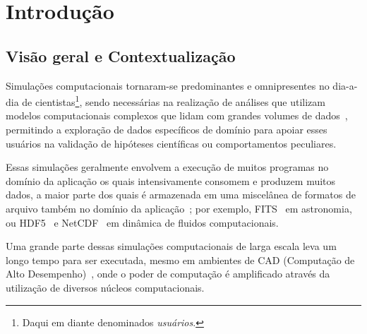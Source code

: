 
\chapter{Introdução}

\section{Visão geral e Contextualização}

Simulações computacionais tornaram-se predominantes e omnipresentes no dia-a-dia de cientistas\footnote{Daqui em diante denominados \textit{usuários}.}, sendo necessárias na realização de análises que utilizam modelos computacionais complexos que lidam com grandes volumes de dados~\cite{silva2015analyzing}, permitindo a exploração de dados específicos de domínio para apoiar esses usuários na validação de hipóteses científicas ou comportamentos peculiares.

Essas simulações geralmente envolvem a execução de muitos programas no domínio da aplicação os quais intensivamente consomem e produzem muitos dados, a maior parte dos quais é armazenada em uma miscelânea de formatos de arquivo também no domínio da aplicação~\cite{silva2015analyzing}; por exemplo,  FITS~\cite{greisen2002representations} em astronomia, ou  HDF5~\cite{hdfgroup2014hdf5} e  NetCDF~\cite{rew1990netcdf} em dinâmica de fluidos computacionais.

Uma grande parte dessas simulações computacionais de larga escala leva um longo tempo para ser executada, mesmo em ambientes de  CAD (Computação de Alto Desempenho)~\cite{silva2017raw}, onde o poder de computação é amplificado através da utilização de diversos núcleos computacionais.

